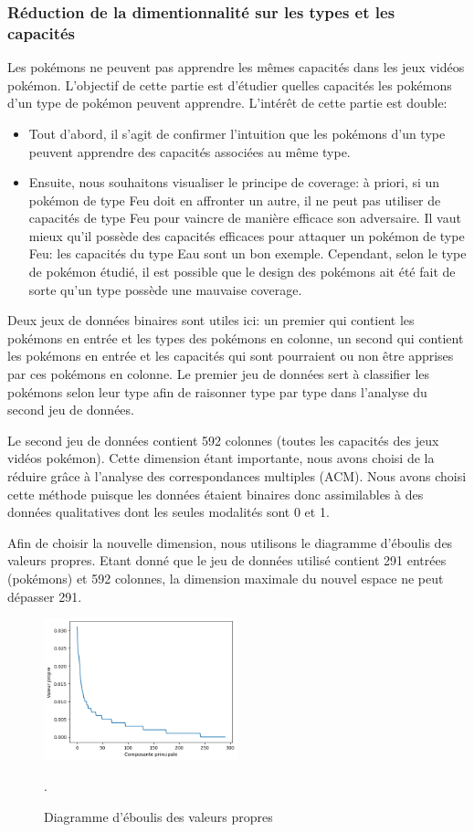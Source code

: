 \documentclass[a4paper,12pt]{article}
\begin{document}
\subsubsection{Réduction de la dimentionnalité sur les types et les capacités}
Les pokémons ne peuvent pas apprendre les mêmes capacités dans les jeux vidéos pokémon. L'objectif de cette partie est d'étudier quelles capacités les pokémons d'un type de pokémon peuvent apprendre. L'intérêt de cette partie est double:  
\begin{itemize}
    \item 
    Tout d'abord, il s'agit de confirmer l'intuition que les pokémons d'un type peuvent apprendre des capacités associées au même type. 
    \item Ensuite, nous souhaitons visualiser le principe de coverage: à priori, si un pokémon de type Feu doit en affronter un autre, il ne peut pas utiliser de capacités de type Feu pour vaincre de manière efficace son adversaire. Il vaut mieux qu'il possède des capacités efficaces pour attaquer un pokémon de type Feu: les capacités du type Eau sont un bon exemple. Cependant, selon le type de pokémon étudié, il est possible que le design des pokémons ait été fait de sorte qu'un type possède une mauvaise coverage. 
\end{itemize}

Deux jeux de données binaires sont utiles ici: un premier qui contient les pokémons en entrée et les types des pokémons en colonne, un second qui contient les pokémons en entrée et les capacités qui sont pourraient ou non être apprises par ces pokémons en colonne. Le premier jeu de données sert à classifier les pokémons selon leur type afin de raisonner type par type dans l'analyse du second jeu de données.

Le second jeu de données contient 592 colonnes (toutes les capacités des jeux vidéos pokémon). Cette dimension étant importante, nous avons choisi de la réduire grâce à l'analyse des correspondances multiples (ACM). Nous avons choisi cette méthode puisque les données étaient binaires donc assimilables à des données qualitatives dont les seules modalités sont 0 et 1. 

Afin de choisir la nouvelle dimension, nous utilisons le diagramme d'éboulis des valeurs propres. Etant donné que le jeu de données utilisé contient 291 entrées (pokémons) et 592 colonnes, la dimension maximale du nouvel espace ne peut dépasser 291. 
\begin{figure}[!h]
    \centering
    \includegraphics[width=0.5\textwidth]{eboulis_MCA.png}
    \caption{Diagramme d'éboulis des valeurs propres}.
\end{figure}
\end{document}
